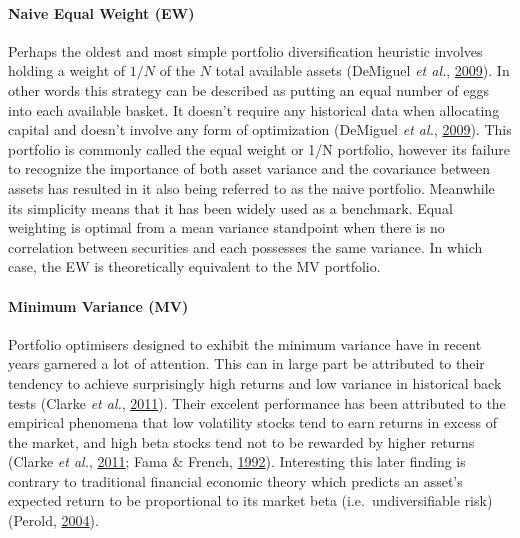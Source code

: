 \documentclass[11pt,preprint, authoryear]{elsarticle}
\numberwithin{equation}{section}
\numberwithin{figure}{section}
\numberwithin{table}{section}
\begin{document}
\hypertarget{naive-equal-weight-ew}{%
\paragraph{Naive Equal Weight (EW)}\label{naive-equal-weight-ew}}

Perhaps the oldest and most simple portfolio diversification heuristic
involves holding a weight of \(1/N\) of the \(N\) total available assets
(DeMiguel \emph{et al.}, \protect\hyperlink{ref-demiguel2009}{2009}). In
other words this strategy can be described as putting an equal number of
eggs into each available basket. It doesn't require any historical data
when allocating capital and doesn't involve any form of optimization
(DeMiguel \emph{et al.}, \protect\hyperlink{ref-demiguel2009}{2009}).
This portfolio is commonly called the equal weight or 1/N portfolio,
however its failure to recognize the importance of both asset variance
and the covariance between assets has resulted in it also being referred
to as the naive portfolio. Meanwhile its simplicity means that it has
been widely used as a benchmark. Equal weighting is optimal from a mean
variance standpoint when there is no correlation between securities and
each possesses the same variance. In which case, the EW is theoretically
equivalent to the MV portfolio.

\hypertarget{minimum-variance-mv}{%
\paragraph{Minimum Variance (MV)}\label{minimum-variance-mv}}

Portfolio optimisers designed to exhibit the minimum variance have in
recent years garnered a lot of attention. This can in large part be
attributed to their tendency to achieve surprisingly high returns and
low variance in historical back tests (Clarke \emph{et al.},
\protect\hyperlink{ref-clarke2011}{2011}). Their excelent performance
has been attributed to the empirical phenomena that low volatility
stocks tend to earn returns in excess of the market, and high beta
stocks tend not to be rewarded by higher returns (Clarke \emph{et al.},
\protect\hyperlink{ref-clarke2011}{2011}; Fama \& French,
\protect\hyperlink{ref-fama1992}{1992}). Interesting this later finding
is contrary to traditional financial economic theory which predicts an
asset's expected return to be proportional to its market beta
(i.e.~undiversifiable risk) (Perold,
\protect\hyperlink{ref-perold2004}{2004}).
\end{document}
